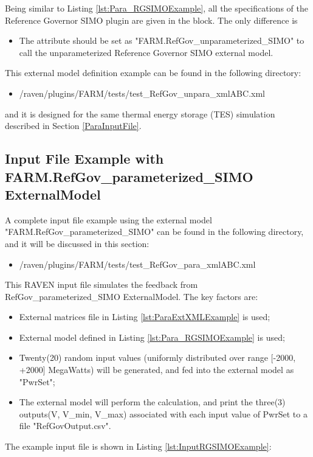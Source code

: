 Being similar to Listing \ref{lst:Para_RGSIMOExample}, all the specifications of the Reference Governor SIMO plugin 
are given in the  block. The only difference is 
\begin{itemize}
  \item The  attribute should be set as "FARM.RefGov\_unparameterized\_SIMO" to call the unparameterized 
  Reference Governor SIMO external model.
\end{itemize}

This external model definition example can be found in the following directory:
\begin{itemize}
  \item /raven/plugins/FARM/tests/test\_RefGov\_unpara\_xmlABC.xml
\end{itemize}

and it is designed for the same thermal energy storage (TES) simulation described in Section \ref{ParaInputFile}.

\subsection{Input File Example with FARM.RefGov\_parameterized\_SIMO ExternalModel}

A complete input file example using the external model "FARM.RefGov\_parameterized\_SIMO" can be found in the 
following directory, and it will be discussed in this section:
\begin{itemize}
  \item /raven/plugins/FARM/tests/test\_RefGov\_para\_xmlABC.xml
\end{itemize}
This RAVEN input file simulates the feedback from RefGov\_parameterized\_SIMO ExternalModel. The key factors are:
\begin{itemize}
  \item External matrices file in Listing \ref{lst:ParaExtXMLExample} is used;
  \item External model defined in Listing \ref{lst:Para_RGSIMOExample} is used;
  \item Twenty(20) random input values (uniformly distributed over range [-2000, +2000] MegaWatts) will be generated, 
  and fed into the external model as "PwrSet";
  \item The external model will perform the calculation, and print the three(3) outputs(V, V\_min, V\_max) associated 
  with each input value of PwrSet to a file "RefGovOutput.csv".
\end{itemize}
The example input file is shown in Listing \ref{lst:InputRGSIMOExample}:

